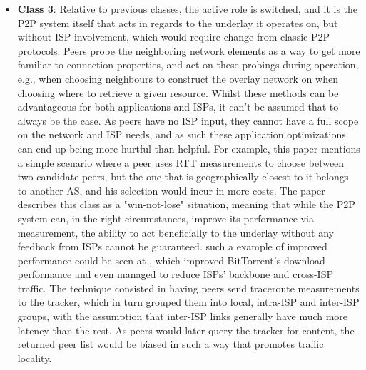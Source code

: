 \documentclass[
  oneside,
  11pt, a4paper,
  footinclude=true,
  headinclude=true,
  cleardoublepage=empty
]{scrbook}
\begin{document}
\begin{itemize}
	    \item \textbf{Class 3}: Relative to previous classes, the active role is switched, and it is the P2P system itself that acts in regards to the underlay it operates on, but without ISP involvement, which would require change from classic P2P protocols. Peers probe the neighboring network elements as a way to get more familiar to connection properties, and act on these probings during operation, e.g., when choosing neighbours to construct the overlay network on when choosing where to retrieve a given resource. Whilst these methods can be advantageous for both applications and ISPs, it can't be assumed that to always be the case. As peers have no ISP input, they cannot have a full scope on the network and ISP needs, and as such these application optimizations can end up being more hurtful than helpful. For example, this paper mentions a simple scenario where a peer uses RTT measurements to choose between two candidate peers, but the one that is geographically closest to it belongs to another AS, and his selection would incur in more costs. The paper describes this class as a "win-not-lose" situation, meaning that while the P2P system can, in the right circumstances, improve its performance via measurement, the ability to act beneficially to the underlay without any feedback from ISPs cannot be guaranteed. such a example of improved performance could be seen at \cite{qin2009}, which improved BitTorrent's download performance and even managed to reduce ISPs' backbone and cross-ISP traffic. The technique consisted in having peers send traceroute measurements to the tracker, which in turn grouped them into local, intra-ISP and inter-ISP groups, with the assumption that inter-ISP links generally have much more latency than the rest. As peers would later query the tracker for content, the returned peer list would be biased in such a way that promotes traffic locality.

\end{itemize}
\end{document}

